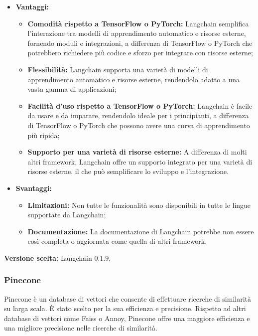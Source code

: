 \documentclass[10pt, a4paper]{article}
\begin{document}
\begin{itemize}
\item \textbf{Vantaggi:}
\begin{itemize}
\item \textbf{Comodità rispetto a TensorFlow o PyTorch:} Langchain semplifica l'interazione tra modelli di apprendimento automatico e risorse esterne, fornendo moduli e integrazioni, a differenza di TensorFlow o PyTorch che potrebbero richiedere più codice e sforzo per integrare con risorse esterne;
\item \textbf{Flessibilità:} Langchain supporta una varietà di modelli di apprendimento automatico e risorse esterne, rendendolo adatto a una vasta gamma di applicazioni;
\item \textbf{Facilità d'uso rispetto a TensorFlow o PyTorch:} Langchain è facile da usare e da imparare, rendendolo ideale per i principianti, a differenza di TensorFlow o PyTorch che possono avere una curva di apprendimento più ripida;
\item \textbf{Supporto per una varietà di risorse esterne:} A differenza di molti altri framework, Langchain offre un supporto integrato per una varietà di risorse esterne, il che può semplificare lo sviluppo e l'integrazione.
\end{itemize}
\item \textbf{Svantaggi:}
\begin{itemize}
\item \textbf{Limitazioni:} Non tutte le funzionalità sono disponibili in tutte le lingue supportate da Langchain;
\item \textbf{Documentazione:} La documentazione di Langchain potrebbe non essere così completa o aggiornata come quella di altri framework.
\end{itemize}
\end{itemize}
\textbf{Versione scelta:} Langchain 0.1.9.

\subsubsection{Pinecone}
Pinecone è un database di vettori che consente di effettuare ricerche di similarità su larga scala. È stato scelto per la sua efficienza e precisione. Rispetto ad altri database di vettori come Faiss o Annoy, Pinecone offre una maggiore efficienza e una migliore precisione nelle ricerche di similarità.
\end{document}

